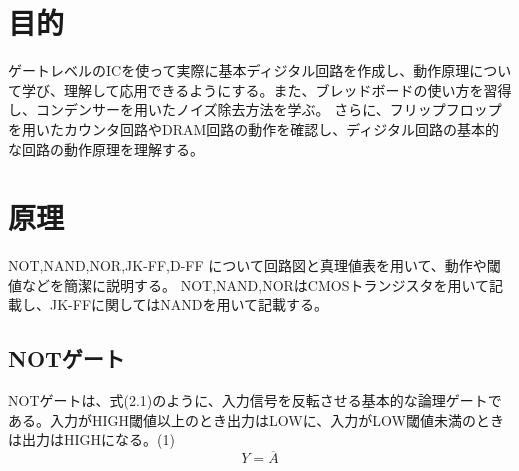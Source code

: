 \documentclass{jlreq}
\numberwithin{equation}{section}
\begin{document}
\section{目的}
ゲートレベルのICを使って実際に基本ディジタル回路を作成し、動作原理について学び、理解して応用できるようにする。また、ブレッドボードの使い方を習得し、コンデンサーを用いたノイズ除去方法を学ぶ。
さらに、フリップフロップを用いたカウンタ回路やDRAM回路の動作を確認し、ディジタル回路の基本的な回路の動作原理を理解する。

\section{原理}
NOT,NAND,NOR,JK-FF,D-FF について回路図と真理値表を用いて、動作や閾値などを簡潔に説明する。
NOT,NAND,NORはCMOSトランジスタを用いて記載し、JK-FFに関してはNANDを用いて記載する。

\subsection{NOTゲート}
NOTゲートは、式(2.1)のように、入力信号を反転させる基本的な論理ゲートである。入力がHIGH閾値以上のとき出力はLOWに、入力がLOW閾値未満のときは出力はHIGHになる。(1)
\begin{equation}
  Y = \overline{A}
\end{equation}
\end{document}
